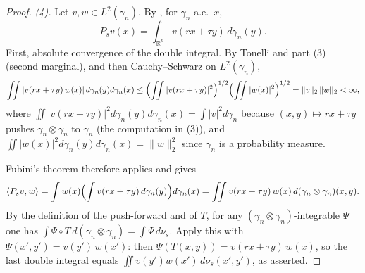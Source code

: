 \begin{proof}
\emph{(4).}
Let $v, w \in L^2(\gamma_n)$.  By , for $\gamma_n$-a.e.\
$x$,
\[
  P_s v(x) = \int_{\mathbb{R}^n} v(rx+\tau y)\, d\gamma_n(y) .
\]
First, absolute convergence of the double integral.  By Tonelli and part (3)
(second marginal), and then Cauchy--Schwarz on $L^2(\gamma_n)$,
\[
  \iint |v(rx+\tau y)\, w(x)|\, d\gamma_n(y)d\gamma_n(x)
    \leq \Bigl(\iint |v(rx+\tau y)|^2\Bigr)^{1/2}
         \Bigl(\iint |w(x)|^2\Bigr)^{1/2}
    = \|v\|_2\,\|w\|_2 < \infty ,
\]
where $\iint |v(rx+\tau y)|^2 d\gamma_n(y)d\gamma_n(x) = \int|v|^2 d\gamma_n$
because $(x,y)\mapsto rx+\tau y$ pushes $\gamma_n\otimes\gamma_n$ to $\gamma_n$
(the computation in (3)), and
$\iint|w(x)|^2 d\gamma_n(y)d\gamma_n(x) = \|w\|_2^2$ since $\gamma_n$ is a
probability measure.

Fubini's theorem therefore applies and gives
\[
  \langle P_s v, w\rangle
    = \int w(x)\Bigl(\int v(rx+\tau y)\, d\gamma_n(y)\Bigr) d\gamma_n(x)
    = \iint v(rx+\tau y)\,w(x)\, d(\gamma_n\otimes\gamma_n)(x,y) .
\]
By the definition of the push-forward and of $T$, for any
$(\gamma_n\otimes\gamma_n)$-integrable $\Psi$ one has
$\int \Psi \circ T \, d(\gamma_n\otimes\gamma_n) = \int \Psi \, d\nu_s$.  Apply
this with $\Psi(x', y') = v(y')\, w(x')$: then
$\Psi(T(x,y)) = v(rx+\tau y)\, w(x)$, so the last double integral equals
$\iint v(y')w(x')\, d\nu_s(x',y')$, as asserted.
\end{proof}

